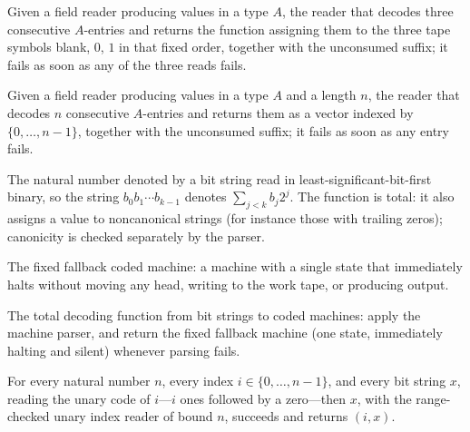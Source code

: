 \begin{definition}
\label{Turing.codeReadSymbols}
\leanok
Given a field reader producing values in a type $A$, the reader that decodes
three consecutive $A$-entries and returns the function assigning them to the
three tape symbols blank, $0$, $1$ in that fixed order, together with the
unconsumed suffix; it fails as soon as any of the three reads fails.
\end{definition}

\begin{definition}
\label{Turing.codeReadVec}
\leanok
Given a field reader producing values in a type $A$ and a length $n$, the
reader that decodes $n$ consecutive $A$-entries and returns them as a vector
indexed by $\{0, \dots, n-1\}$, together with the unconsumed suffix; it fails
as soon as any entry fails.
\end{definition}

\begin{definition}
\label{Turing.codeBitsNat}
\leanok
The natural number denoted by a bit string read in least-significant-bit-first
binary, so the string $b_0 b_1 \cdots b_{k-1}$ denotes $\sum_{j<k} b_j 2^j$.
The function is total: it also assigns a value to noncanonical strings (for
instance those with trailing zeros); canonicity is checked separately by the
parser.
\end{definition}

\begin{definition}
\label{Turing.codeFallback}
\leanok
{}
The fixed fallback coded machine: a machine with a single state that
immediately halts without moving any head, writing to the work tape, or
producing output.
\end{definition}

\begin{definition}
\label{Turing.codeDecode}
\leanok
{}
The total decoding function from bit strings to coded machines: apply the
machine parser, and return the fixed fallback machine (one state, immediately
halting and silent) whenever parsing fails.
\end{definition}

\begin{lemma}
\label{Turing.codeReadFin_append}
\leanok
{}
For every natural number $n$, every index $i\in\{0,\ldots,n-1\}$, and every bit string
$x$, reading the unary code of $i$—$i$ ones followed by a zero—then $x$, with the
range-checked unary index reader of bound $n$, succeeds and returns $(i,x)$.
\end{lemma}

